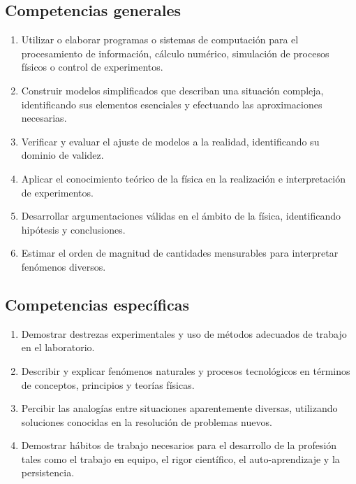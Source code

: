 \documentclass{article}
\begin{document}
\subsection{Competencias generales} %
\begin{enumerate}[2.{1}.1]
\item Utilizar o elaborar programas o sistemas de computación para el procesamiento de información, cálculo numérico, simulación de procesos físicos o control de experimentos.

\item Construir modelos simplificados que describan una situación compleja, identificando sus elementos esenciales y efectuando las aproximaciones necesarias.

\item Verificar y evaluar el ajuste de modelos a la realidad, identificando su dominio de validez.

\item Aplicar el conocimiento teórico de la física en la realización e interpretación de experimentos.

\item Desarrollar argumentaciones válidas en el ámbito de la física, identificando hipótesis y conclusiones.

\item Estimar el orden de magnitud de cantidades mensurables para interpretar fenómenos diversos.


 

\end{enumerate}


\subsection{Competencias específicas}
\begin{enumerate}[\hspace{3ex}a)]
\item Demostrar destrezas experimentales y uso de métodos adecuados de trabajo en el laboratorio.
\item Describir y explicar fenómenos naturales y procesos tecnológicos en términos de conceptos, principios y teorías físicas.
\item Percibir las analogías entre situaciones aparentemente diversas, utilizando soluciones conocidas en la resolución de problemas nuevos.
\item Demostrar hábitos de trabajo necesarios para el desarrollo de la profesión tales como el trabajo en equipo, el rigor científico, el auto-aprendizaje y la persistencia. 

\end{enumerate}
\end{document}

